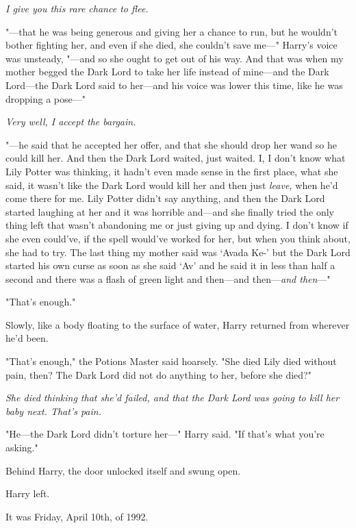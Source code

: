 \emph{I give you this rare chance to flee.}

"---that he was being generous and giving her a chance to run, but he wouldn't
bother fighting her, and even if she died, she couldn't save me---" Harry's
voice was unsteady, "---and so she ought to get out of his way. And that was
when my mother begged the Dark Lord to take her life instead of mine---and the
Dark Lord---the Dark Lord said to her---and his voice was lower this time, like
he was dropping a pose---"

\emph{Very well, I accept the bargain.}

"---he said that he accepted her offer, and that she should drop her wand so he
could kill her. And then the Dark Lord waited, just waited. I, I don't know
what Lily Potter was thinking, it hadn't even made sense in the first place,
what she said, it wasn't like the Dark Lord would kill her and then just
\emph{leave,} when he'd come there for me. Lily Potter didn't say anything, and
then the Dark Lord started laughing at her and it was horrible and---and she
finally tried the only thing left that wasn't abandoning me or just giving up
and dying. I don't know if she even could've, if the spell would've worked for
her, but when you think about, she had to try. The last thing my mother said
was `Avada Ke-' but the Dark Lord started his own curse as soon as she said
`Av' and he said it in less than half a second and there was a flash of green
light and then---and then---\emph{and then}---"

"That's enough."

Slowly, like a body floating to the surface of water, Harry returned from
wherever he'd been.

"That's enough," the Potions Master said hoarsely. "She died{\el} Lily died
without pain, then? The Dark Lord{\el} did not do anything to her, before
she died?"

\emph{She died thinking that she'd failed, and that the Dark Lord was going to
kill her baby next. That's pain.}

"He---the Dark Lord didn't torture her---" Harry said. "If that's what you're
asking."

Behind Harry, the door unlocked itself and swung open.

Harry left.

It was Friday, April 10th, of 1992.
